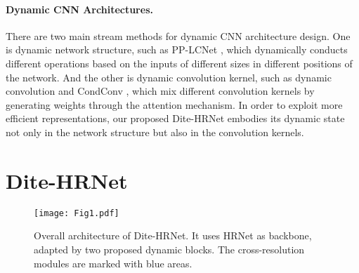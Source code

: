 \documentclass{article}
\begin{document}
\paragraph{Dynamic CNN Architectures.} There are two main stream methods for dynamic CNN architecture design. One is dynamic network structure, such as PP-LCNet \cite{cui:pplcnet}, which dynamically conducts different operations based on the inputs of different sizes in different positions of the network. And the other is dynamic convolution kernel, such as dynamic convolution \cite{chen:dyconv} and CondConv \cite{yang:condconv}, which mix different convolution kernels by generating weights through the attention mechanism. In order to exploit more efficient representations, our proposed Dite-HRNet embodies its dynamic state not only in the network structure but also in the convolution kernels.

\section{Dite-HRNet}

\begin{figure}[t]
\centering
\texttt{[image: Fig1.pdf]}
\caption{Overall architecture of Dite-HRNet. It uses HRNet \protect \cite{sun:hrnet} as backbone, adapted by two proposed dynamic blocks. The cross-resolution modules are marked with blue areas.}
\label{fig1}
\end{figure}

\begin{table}[t]
\centering
{}
\caption{Structure of Dite-HRNet. DGC = Dynamic Global Context. DMC = Dynamic Multi-scale Context. \# = number of. $\times$ denotes repetitions of each operator in one cross-resolution module.}
\label{tab1}
\end{table}
\end{document}
